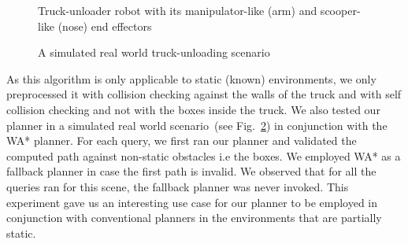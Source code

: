 \documentclass[a4paper]{report}
\begin{document}
\begin{figure}
\centering
  \caption{
  Truck-unloader robot with its manipulator-like (arm) and scooper-like (nose) end effectors
}
    \label{fig:gmt}
\end{figure}

\begin{figure}
\centering
  \caption{
  A simulated real world truck-unloading scenario
}
    \label{fig:gmt_sim}
\end{figure}

\begin{table*}[ht]
\centering
     \resizebox{0.7\columnwidth}{!}{%
        \begin{tabular}{ l | c c c c}  
           & arm & nose & arm+base & nose+base\\
         \hline
         WA* 		& 12.8 & 7.2 & 7.5 & 4.4 \\
         Our Method & 0.69 & 0.29 & 0.5 & 0.47 \\
        \end{tabular}
    }
    \caption{Comparison of mean planning times~[ms] averaged over 100 randomized queries for different modes of operation of the truck-unloading robot. The number of subregions preprocessed for each of these modes~(left to right) are~101,~7,~85 and~308.}
    \label{tab:gmt}
\end{table*}

As this algorithm is only applicable to static (known) environments, we only preprocessed it with collision checking against the walls of the truck and with self collision checking and not with the boxes inside the truck. We also tested our planner in a simulated real world scenario~(see Fig.~\ref{fig:gmt_sim}) in conjunction with the WA* planner. For each query, we first ran our planner and validated the computed path against non-static obstacles i.e the boxes. We employed WA* as a fallback planner in case the first path is invalid. We observed that for all the queries ran for this scene, the fallback planner was never invoked. This experiment gave us an interesting use case for our planner to be employed in conjunction with conventional planners in the environments that are partially static.
\end{document}

